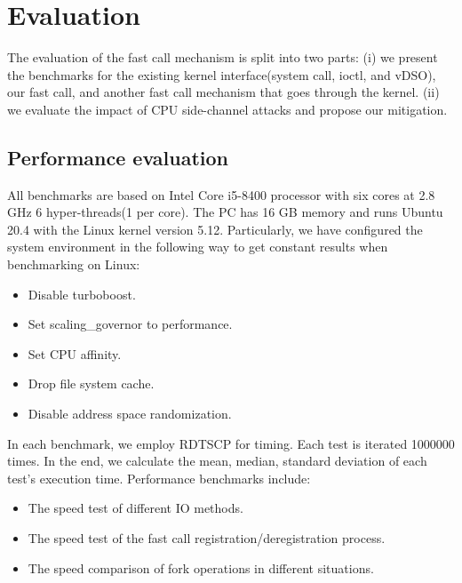 \chapter{Evaluation}
\label{sec:evaluation}


The evaluation of the fast call mechanism is split into two parts: 
(i) we present the benchmarks for the existing kernel interface(system 
call, ioctl, and vDSO)\cite{9, 28}, our fast call, and another fast call mechanism that 
goes through the kernel.  (ii) we evaluate the impact of CPU side-channel attacks\cite{3,4} 
and propose our mitigation.

\section{Performance evaluation}

All benchmarks are based on  Intel Core i5-8400 processor 
with six cores at 2.8 GHz 6 hyper-threads(1 per core). 
The PC has 16 GB memory and runs Ubuntu 20.4 with the Linux 
kernel version 5.12. Particularly, we have configured the system 
environment in the following way to get constant results when 
benchmarking on Linux\cite{29}:

\begin{itemize}
  \item Disable turboboost.
  \item Set scaling\_governor to performance.
  \item Set CPU affinity.
  \item Drop file system cache.
  \item Disable address space randomization.
\end{itemize}


In each benchmark, we employ RDTSCP for timing. Each test is 
iterated 1000000 times. In the end, we calculate the mean, median, 
standard deviation of each test's execution time. Performance benchmarks include:
\begin{itemize}
  \item The speed test of different IO methods.
  \item The speed test of the fast call registration/deregistration process.
  \item The speed comparison of fork operations in different situations.
\end{itemize}


